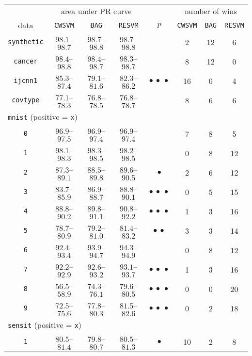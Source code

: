 \documentclass[preprint,elsarticle-num,12pt]{elsarticle}
\begin{document}
\begin{table}[!h]
\centering
\begin{tabular}{cccccccc}
\toprule
 & \multicolumn{3}{c}{area under PR curve} & & \multicolumn{3}{c}{number of wins} \\ \cline{2-4} \cline{6-8}
data & \texttt{CWSVM} & \texttt{BAG} & \texttt{RESVM} & $p$ & \texttt{CWSVM} & \texttt{BAG} & \texttt{RESVM} \\
\midrule
\texttt{synthetic} & $98.1$--$98.7$ & $98.7$--$98.8$ & $98.7$--$98.8$ &  & 2 & 12 & 6\\
\texttt{cancer} & $98.4$--$98.8$ & $98.4$--$98.7$ & $98.3$--$98.7$ &  & 8 & 12 & 0\\
\texttt{ijcnn1} & $85.3$--$87.4$ & $79.1$--$81.6$ & $82.3$--$86.2$ & $\bullet\ \bullet\ \bullet$ & 16 & 0 & 4\\
\texttt{covtype} & $77.1$--$78.3$ & $76.8$--$78.5$ & $76.8$--$78.7$ &  & 8 & 6 & 6\\ 
\multicolumn{3}{l}{\texttt{mnist} (positive = \texttt{x})} \\
\texttt{0} & $96.9$--$97.5$ & $96.9$--$97.4$ & $96.9$--$97.4$ &  & 7 & 8 & 5\\ 
\texttt{1} & $98.1$--$98.3$ & $98.3$--$98.5$ & $98.2$--$98.5$ &  & 0 & 8 & 12\\ 
\texttt{2} & $87.3$--$89.1$ & $88.5$--$89.8$ & $89.6$--$90.5$ & $\bullet$ & 2 & 6 & 12\\ 
\texttt{3} & $83.7$--$85.9$ & $86.9$--$88.7$ & $88.8$--$90.1$ & $\bullet\ \bullet\ \bullet$ & 0 & 5 & 15\\ 
\texttt{4} & $88.8$--$90.2$ & $89.8$--$91.1$ & $90.8$--$92.2$ & $\bullet\ \bullet\ \bullet$ & 1 & 3 & 16\\ 
\texttt{5} & $78.7$--$80.9$ & $79.2$--$81.0$ & $81.4$--$83.2$ & $\bullet\ \bullet$ & 3 & 3 & 14\\ 
\texttt{6} & $92.4$--$93.4$ & $93.9$--$94.7$ & $94.3$--$94.9$ &  & 0 & 8 & 12\\ 
\texttt{7} & $92.2$--$92.9$ & $92.6$--$93.2$ & $93.1$--$93.7$ & $\bullet\ \bullet\ \bullet$ & 1 & 3 & 16\\ 
\texttt{8} & $56.5$--$58.9$ & $74.3$--$76.1$ & $79.6$--$80.5$ & $\bullet\ \bullet\ \bullet$ & 0 & 0 & 20\\ 
\texttt{9} & $72.5$--$75.6$ & $77.8$--$80.3$ & $81.5$--$82.6$ & $\bullet\ \bullet\ \bullet$ & 0 & 2 & 18\\ 
\multicolumn{3}{l}{\texttt{sensit} (positive = \texttt{x})} \\
\texttt{1} & $80.5$--$81.4$ & $79.8$--$80.7$ & $80.5$--$81.3$ & $\bullet$ & 10 & 2 & 8\\ 

\end{tabular}
\end{table}
\end{document}
